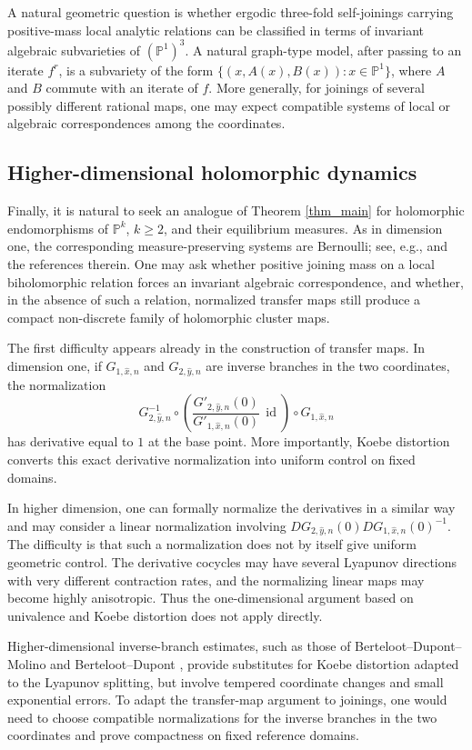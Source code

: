 \documentclass[11pt]{amsart}
\numberwithin{equation}{section}
\theoremstyle{plain}
\theoremstyle{definition}
\theoremstyle{remark}
\begin{document}
A natural geometric question is whether ergodic three-fold
self-joinings carrying positive-mass local analytic relations can be
classified in terms of invariant algebraic subvarieties of
$(\mathbb P^1)^3$.
A natural graph-type model, after passing to an iterate $f^r$, is a
subvariety of the form
$\{(x,A(x),B(x)):x\in\mathbb P^1\}$, where $A$ and $B$ commute with
an iterate of $f$. More generally, for joinings of several possibly
different rational maps, one may expect compatible systems of local or
algebraic correspondences among the coordinates.


\subsection{Higher-dimensional holomorphic dynamics}
\label{subsec:higher-dimensional-questions}
Finally, it is natural to seek an analogue of Theorem \ref{thm_main}
for holomorphic endomorphisms of $\mathbb P^k$, $k\geq2$, and their
equilibrium measures.
As in dimension one, the corresponding measure-preserving systems
are Bernoulli; see, e.g., \cite[Section 1.6]{dinh2010dynamics} and the
references therein.
One may ask whether positive joining mass on a local biholomorphic
relation forces an invariant algebraic correspondence, and whether,
in the absence of such a relation, normalized transfer maps still
produce a compact non-discrete family of holomorphic cluster maps.

The first difficulty appears already in the construction of transfer
maps. In dimension one, if $G_{1,\hat x,n}$ and $G_{2,\hat y,n}$ are
inverse branches in the two coordinates, the normalization
$$
G_{2,\hat y,n}^{-1}\circ\left(
\frac{G'_{2,\hat y,n}(0)}{G'_{1,\hat x,n}(0)}\,\operatorname{id}
\right)\circ G_{1,\hat x,n}
$$
has derivative equal to $1$ at the base point. More importantly, Koebe
distortion converts this exact derivative normalization into uniform
control on fixed domains.

In higher dimension, one can formally normalize the derivatives in a
similar way and may consider a linear normalization involving
$DG_{2,\hat y,n}(0)DG_{1,\hat x,n}(0)^{-1}$. The difficulty is that such
a normalization does not by itself give uniform geometric control. The
derivative cocycles may have several Lyapunov directions with very
different contraction rates, and the normalizing linear maps may become
highly anisotropic. Thus the one-dimensional argument based on
univalence and Koebe distortion
 does not apply directly.

Higher-dimensional inverse-branch estimates, such as those of
Berteloot--Dupont--Molino \cite{BDM} and Berteloot--Dupont \cite{BD},
provide substitutes for Koebe distortion adapted to the
Lyapunov splitting, but involve tempered coordinate changes and
small exponential errors.
To adapt the transfer-map argument to joinings, one would need to
choose compatible normalizations for the inverse branches in the two
coordinates and prove compactness on fixed reference domains.
\end{document}

